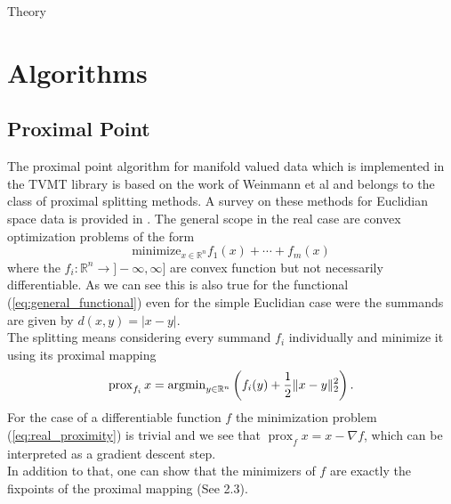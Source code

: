 \begin{chapter}{Theory}

\section{Algorithms} %
\label{sec:Algorithms}

\subsection{Proximal Point} %
\label{sub:ProximalPoint}
The proximal point algorithm for manifold valued data which is implemented in the TVMT library is based on the work of Weinmann et al\cite{Weinmann} and belongs to the class
of proximal splitting methods. A survey on these methods for Euclidian space data is provided in \cite{CombettesPesque}. The general scope in the real case are convex
optimization problems of the form
\begin{equation}
    \text{minimize}_{x\in \mathbb{R}^n} f_1(x) + \cdots +f_m(x)
\end{equation}
where the $f_i:\mathbb{R}^n\to]-\infty,\infty]$ are convex function but not necessarily differentiable. As we can see this is also true for the functional (\ref{eq:general_functional})
even for the simple Euclidian case were the summands are given by $d(x,y)=|x-y|$. \\
The splitting means considering every summand $f_i$ individually and minimize it using its proximal mapping
\begin{equation}
    \label{eq:real_proximity}
    \operatorname{prox}_{f_i}x=\operatorname{argmin}_{y\in\mathbb{R}^n}\left(f_i(y) + \frac{1}{2}\| x-y \|^2_{2} \right).
\end{equation}
For the case of a differentiable function $f$ the minimization problem (\ref{eq:real_proximity}) is trivial and we see that $\operatorname{prox}_f x = x-\nabla f$, which 
can be interpreted as a gradient descent step.\\
In addition to that, one can show that the minimizers of $f$ are exactly the fixpoints of the proximal mapping (See \cite{ParikhBoyd} 2.3).


\end{chapter}

